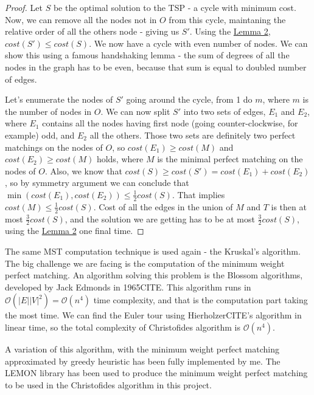 \documentclass[12pt,twoside,notitlepage]{report}
\begin{document}
\begin{proof}

Let $S$ be the optimal solution to the TSP - a cycle with minimum cost. Now, we can remove all the nodes not in $O$ from this cycle, maintaning the relative order of all the others node - giving us $S'$. Using the \hyperref[shortcutting]{Lemma 2}, $cost(S') \leq cost(S)$. We now have a cycle with even number of nodes. We can show this using a famous handshaking lemma - the sum of degrees of all the nodes in the graph has to be even, because that sum is equal to doubled number of edges.

\small

Let's enumerate the nodes of $S'$ going around the cycle, from 1 do $m$, where $m$ is the number of nodes in $O$. We can now split $S'$ into two sets of edges, $E_1$ and $E_2$, where $E_1$ contains all the nodes having first node (going counter-clockwise, for example) odd, and $E_2$ all the others. Those two sets are definitely two perfect matchings on the nodes of $O$, so $cost(E_1) \geq cost(M)$ and $cost(E_2) \geq cost(M)$ holds, where $M$ is the minimal perfect matching on the nodes of $O$. Also, we know that $cost(S) \geq cost(S') = cost(E_1) + cost(E_2)$, so by symmetry argument we can conclude that $\min(cost(E_1), cost(E_2)) \leq \frac{1}{2}cost(S)$. That implies $cost(M) \leq \frac{1}{2}cost(S)$. Cost of all the edges in the union of $M$ and $T$ is then at most $\frac{3}{2} cost(S)$, and the solution we are getting has to be at most $\frac{3}{2} cost(S)$, using the \hyperref[shortcutting]{Lemma 2} one final time.

\end{proof}

The same MST computation technique is used again - the Kruskal's algorithm. The big challenge we are facing is the computation of the minimum weight perfect matching. An algorithm solving this problem is the Blossom algorithms, developed by Jack Edmonds in 1965CITE. This algorithm runs in $\mathcal{O}(|E||V|^2) = \mathcal{O}(n^4)$ time complexity, and that is the computation part taking the most time. We can find the Euler tour using HierholzerCITE's algorithm in linear time, so the total complexity of Christofides algorithm is $\mathcal{O}(n^4)$.

A variation of this algorithm, with the minimum weight perfect matching approximated by greedy heuristic has been fully implemented by me. The LEMON library has been used to produce the minimum weight perfect matching to be used in the Christofides algorithm in this project.
\end{document}
